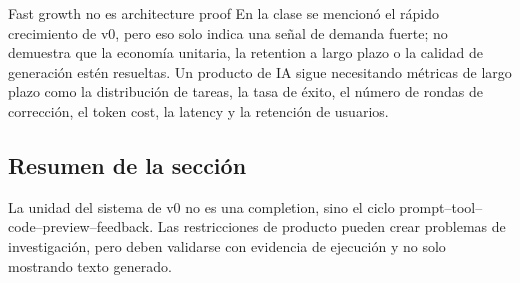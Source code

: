 \begin{warningbox}{Fast growth no es architecture proof}
En la clase se mencionó el rápido crecimiento de v0, pero eso solo indica una señal de demanda fuerte; no demuestra que la economía unitaria, la retention a largo plazo o la calidad de generación estén resueltas. Un producto de IA sigue necesitando métricas de largo plazo como la distribución de tareas, la tasa de éxito, el número de rondas de corrección, el token cost, la latency y la retención de usuarios.
\end{warningbox}


\subsection{Resumen de la sección}

La unidad del sistema de v0 no es una completion, sino el ciclo prompt--tool--code--preview--feedback. Las restricciones de producto pueden crear problemas de investigación, pero deben validarse con evidencia de ejecución y no solo mostrando texto generado.
